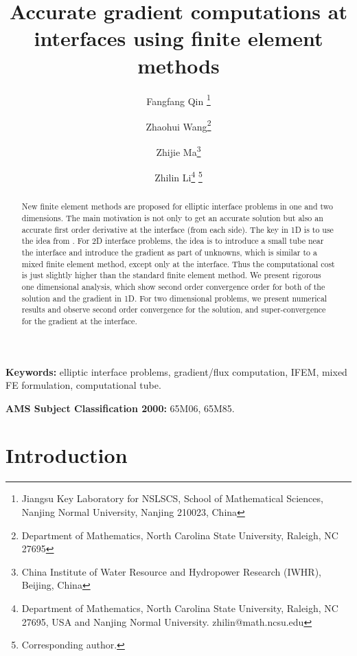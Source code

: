 \documentclass[11pt]{article}
\numberwithin{equation}{section}
\begin{document}
\title{Accurate gradient computations at interfaces using finite element methods}

\author{Fangfang Qin
\thanks{Jiangsu Key Laboratory for NSLSCS, School of Mathematical Sciences,
Nanjing Normal University, Nanjing 210023, China}
\and Zhaohui Wang\thanks{Department of Mathematics, North Carolina State University, Raleigh, NC 27695}
\and Zhijie Ma\thanks{China Institute of Water Resource and Hydropower Research (IWHR), Beijing, China}
\and Zhilin Li\thanks{Department of Mathematics, North Carolina State University, Raleigh, NC 27695, USA and Nanjing Normal University. zhilin@math.ncsu.edu} \footnote{Corresponding author.} }

\maketitle

\setlength{\baselineskip}{16pt}%
\begin{abstract}
New finite element  methods  are  proposed for elliptic interface problems in one and two dimensions.
The main motivation is not only to get an accurate solution
but also an accurate first order derivative at the interface (from each side).
The key in 1D is to use the idea from \cite{wheeler1974galerkin}.
For 2D interface problems, the idea is to introduce a small tube near the interface and introduce the gradient as part of unknowns,
which is similar to a mixed finite element method, except only at  the interface.
Thus the computational cost is just slightly higher than the standard finite element method.
We present rigorous one dimensional analysis,
which show second order convergence order for both of the solution and the gradient in 1D.
For two dimensional problems,
we present  numerical results and  observe   second order convergence  for the solution,
and super-convergence for the gradient at the interface.
\end{abstract}

{\bf Keywords: }
elliptic interface problems,  gradient/flux computation, IFEM, mixed FE formulation, computational tube.

{\bf AMS Subject Classification 2000:}
65M06, 65M85.

\section{Introduction}
\end{document}
